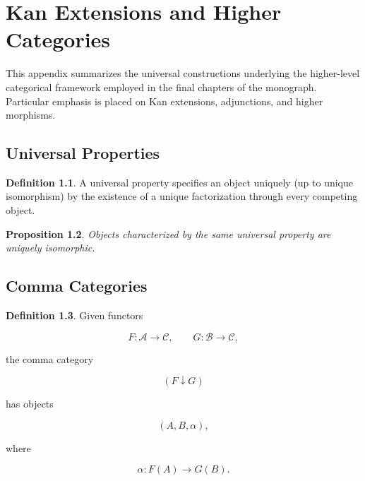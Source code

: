 \documentclass[11pt]{book}
\numberwithin{equation}{chapter}
\theoremstyle{definition}
\newtheorem{definition}{Definition}[chapter]
\theoremstyle{plain}
\newtheorem{proposition}[definition]{Proposition}
\begin{document}
\chapter{Kan Extensions and Higher Categories}

This appendix summarizes the universal constructions underlying the
higher-level categorical framework employed in the final chapters of the
monograph. Particular emphasis is placed on Kan extensions, adjunctions,
and higher morphisms.


\section{Universal Properties}

\begin{definition}

A universal property specifies an object uniquely (up to unique
isomorphism) by the existence of a unique factorization through every
competing object.

\end{definition}


\begin{proposition}

Objects characterized by the same universal property are uniquely
isomorphic.

\end{proposition}


\section{Comma Categories}

\begin{definition}

Given functors

\[
F:\mathcal A\rightarrow\mathcal C,
\qquad
G:\mathcal B\rightarrow\mathcal C,
\]

the comma category

\[
(F\downarrow G)
\]

has objects

\[
(A,B,\alpha),
\]

where

\[
\alpha:
F(A)\rightarrow G(B).
\]

\end{definition}
\end{document}
